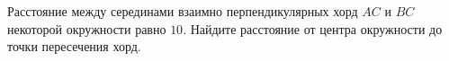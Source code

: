 \begin{ex}
	\begin{condition}
		Расстояние между серединами взаимно перпендикулярных хорд \( AC  \) и \( BC  \) некоторой окружности равно \( 10 \). Найдите расстояние от центра окружности до точки пересечения хорд.
	\end{condition}
\end{ex}